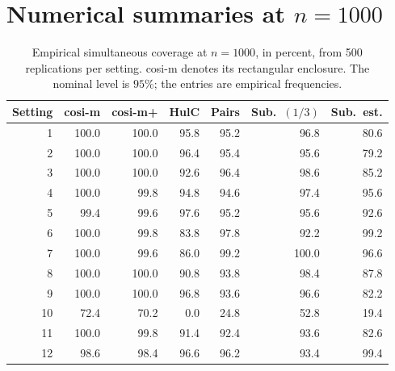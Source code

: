\documentclass[10pt]{article}
\begin{document}
\section{Numerical summaries at \texorpdfstring{$n=1000$}{n=1000}}
\begin{table}[H]\centering\small
\begin{tabular}{@{}r rrrrrr@{}}\toprule
Setting & cosi-m & cosi-m+ & HulC & Pairs & Sub.\ $(1/3)$ & Sub.\ est.\\\midrule
1 & 100.0 & 100.0 & 95.8 & 95.2 & 96.8 & 80.6 \\
2 & 100.0 & 100.0 & 96.4 & 95.4 & 95.6 & 79.2 \\
3 & 100.0 & 100.0 & 92.6 & 96.4 & 98.6 & 85.2 \\
4 & 100.0 & 99.8 & 94.8 & 94.6 & 97.4 & 95.6 \\
5 & 99.4 & 99.6 & 97.6 & 95.2 & 95.6 & 92.6 \\
6 & 100.0 & 99.8 & 83.8 & 97.8 & 92.2 & 99.2 \\
7 & 100.0 & 99.6 & 86.0 & 99.2 & 100.0 & 96.6 \\
8 & 100.0 & 100.0 & 90.8 & 93.8 & 98.4 & 87.8 \\
9 & 100.0 & 100.0 & 96.8 & 93.6 & 96.6 & 82.2 \\
10 & 72.4 & 70.2 & 0.0 & 24.8 & 52.8 & 19.4 \\
11 & 100.0 & 99.8 & 91.4 & 92.4 & 93.6 & 82.6 \\
12 & 98.6 & 98.4 & 96.6 & 96.2 & 93.4 & 99.4 \\
\bottomrule\end{tabular}
\caption{Empirical simultaneous coverage at $n=1000$, in percent, from 500
replications per setting. cosi-m denotes its rectangular enclosure. The nominal
level is $95\%$; the entries are empirical frequencies.}
\label{tab:coverage}\end{table}
\end{document}
